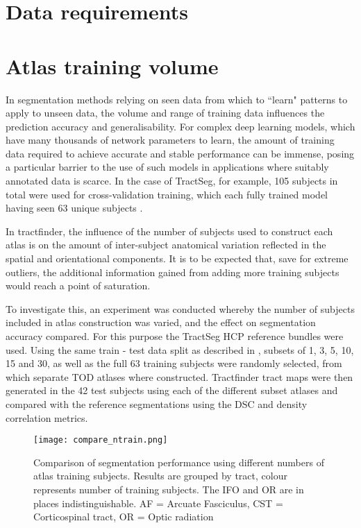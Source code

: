 \section{Data requirements}


\section{Atlas training volume}

In segmentation methods relying on seen data from which to ``learn" patterns to apply to unseen data, the volume and range of training data influences the prediction accuracy and generalisability. 
For complex deep learning models, which have many thousands of network parameters to learn, the amount of training data required to achieve accurate and stable performance can be immense, posing a particular barrier to the use of such models in applications where suitably annotated data is scarce.
In the case of TractSeg, for example, 105 subjects in total were used for cross-validation training, which each fully trained model having seen 63 unique subjects .

In tractfinder, the influence of the number of subjects used to construct each atlas is on the amount of inter-subject anatomical variation reflected in the spatial and orientational components.
It is to be expected that, save for extreme outliers, the additional information gained from adding more training subjects would reach a point of saturation.

To investigate this, an experiment was conducted whereby the number of subjects included in atlas construction was varied, and the effect on segmentation accuracy compared.
For this purpose the TractSeg HCP reference bundles were used.
Using the same train - test data split as described in , subsets of 1, 3, 5, 10, 15 and 30, as well as the full 63 training subjects were randomly selected, from which separate TOD atlases where constructed.
Tractfinder tract maps were then generated in the 42 test subjects using each of the different subset atlases and compared with the reference segmentations using the DSC and density correlation metrics.

\begin{figure}
    \texttt{[image: compare\_ntrain.png]}
    \caption{Comparison of segmentation performance using different numbers of atlas training subjects. Results are grouped by tract, colour represents number of training subjects. The IFO and OR are in places indistinguishable. AF = Arcuate Fasciculus, CST = Corticospinal tract, OR = Optic radiation}
    \label{fig:ntrain}
\end{figure}

